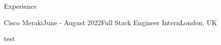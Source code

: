 \documentclass{structure} %
\begin{document}

\begin{rSection}{Experience}

\begin{rSubsection}{Cisco Meraki}{June - August 2022}{Full Stack Engineer Intern}{London, UK}{}
   \item test 
\end{rSubsection}

\end{rSection}


\end{document}
